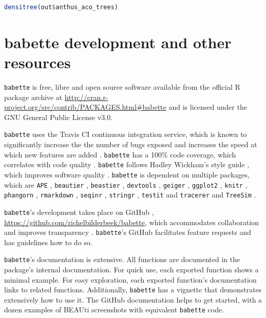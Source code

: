 \documentclass{article}
\begin{document}
\begin{lstlisting}[language=R, floatplacement=H]
densitree(out$anthus_aco_trees)
\end{lstlisting}

\section{babette development and other resources}

\verb;babette; is free, libre and open source software available from the official R package archive at 
\url{http://cran.r-project.org/src/contrib/PACKAGES.html\#babette}
and is licensed under the GNU General Public License v3.0.

\verb;babette; uses the Travis CI \cite{travis} 
continuous integration service, which is known to significantly 
increase the the number of bugs exposed \cite{vasilescu2015} and increases
the speed at which new features are added \cite{vasilescu2015}.
\verb;babette; has a 100\% code coverage, which correlates with code quality \cite{horgan1994,del1995correlation}. 
\verb;babette; follows Hadley Wickham's style guide \cite{style_guide}, which improves software quality \cite{fang2001}.
\verb;babette; is dependent on multiple packages, which are 
\verb;APE; \cite{APE}, 
\verb;beautier; \cite{beautier},
\verb;beastier; \cite{beastier},
\verb;devtools; \cite{devtools},
\verb;geiger; \cite{GEIGER},
\verb;ggplot2; \cite{ggplot2},
\verb;knitr; \cite{knitr},
\verb;phangorn; \cite{phangorn},
\verb;rmarkdown; \cite{rmarkdown},
\verb;seqinr; \cite{seqinr},
\verb;stringr; \cite{stringr},
\verb;testit; \cite{testit} and 
\verb;tracerer; \cite{tracerer} and
\verb;TreeSim; \cite{TreeSim}.

\verb;babette;'s development takes place on GitHub \cite{github},
\url{https://github.com/richelbilderbeek/babette}, 
which accommodates collaboration \cite{perez2016ten} 
and improves transparency \cite{gorgolewski2016practical}.
\verb;babette;'s GitHub facilitates feature requests and has guidelines how to do so.

\verb;babette;'s documentation is extensive. All functions are documented
in the package's internal documentation. For quick use, 
each exported function shows a minimal example. 
For easy exploration, each exported function's documentation links to related functions.
Additionally, \verb;babette; has a vignette that demonstrates extensively how
to use it. The GitHub documentation helps to get started, with a dozen examples 
of BEAUti screenshots with equivalent \verb;babette; code.
\end{document}
